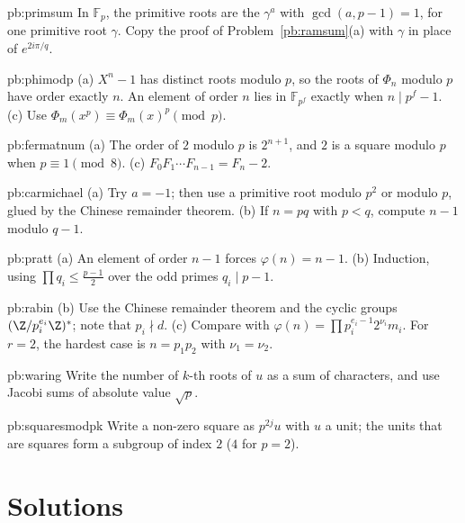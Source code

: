 \begin{hint}{pb:primsum}
In $\mathbb F_p$, the primitive roots are the $\gamma^a$ with $\gcd(a,p-1)=1$, for one primitive root $\gamma$. Copy the
proof of Problem~\ref{pb:ramsum}(a) with $\gamma$ in place of $e^{2i\pi/q}$.
\end{hint}

\begin{hint}{pb:phimodp}
(a) $X^n-1$ has distinct roots modulo $p$, so the roots of $\Phi_n$ modulo $p$ have order exactly $n$. An element of order $n$
lies in $\mathbb F_{p^f}$ exactly when $n\mid p^f-1$. (c) Use $\Phi_m(x^p)\equiv\Phi_m(x)^p\pmod p$.
\end{hint}

\begin{hint}{pb:fermatnum}
(a) The order of $2$ modulo $p$ is $2^{n+1}$, and $2$ is a square modulo $p$ when $p\equiv1\pmod8$. (c) $F_0F_1\cdots F_{n-1}=F_n-2$.
\end{hint}

\begin{hint}{pb:carmichael}
(a) Try $a=-1$; then use a primitive root modulo $p^2$ or modulo $p$, glued by the Chinese remainder theorem. (b) If $n=pq$
with $p<q$, compute $n-1$ modulo $q-1$.
\end{hint}

\begin{hint}{pb:pratt}
(a) An element of order $n-1$ forces $\varphi(n)=n-1$. (b) Induction, using $\prod q_i\le\frac{p-1}2$ over the odd primes $q_i\mid p-1$.
\end{hint}

\begin{hint}{pb:rabin}
(b) Use the Chinese remainder theorem and the cyclic groups $(\Z/p_i^{e_i}\Z)^*$; note that $p_i\nmid d$. (c) Compare with
$\varphi(n)=\prod p_i^{e_i-1}2^{\nu_i}m_i$. For $r=2$, the hardest case is $n=p_1p_2$ with $\nu_1=\nu_2$.
\end{hint}

\begin{hint}{pb:waring}
Write the number of $k$-th roots of $u$ as a sum of characters, and use Jacobi sums of absolute value $\sqrt p$.
\end{hint}

\begin{hint}{pb:squaresmodpk}
Write a non-zero square as $p^{2j}u$ with $u$ a unit; the units that are squares form a subgroup of index $2$ ($4$ for $p=2$).
\end{hint}

\section{Solutions}

